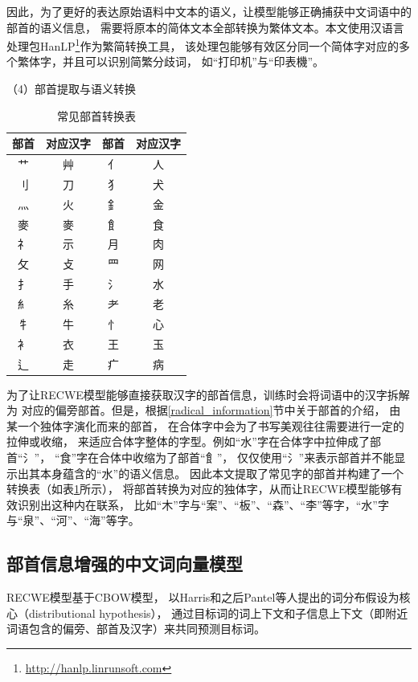 因此，为了更好的表达原始语料中文本的语义，让模型能够正确捕获中文词语中的部首的语义信息，
需要将原本的简体文本全部转换为繁体文本。本文使用汉语言处理包HanLP\footnote{\url{http://hanlp.linrunsoft.com}}作为繁简转换工具，
该处理包能够有效区分同一个简体字对应的多个繁体字，并且可以识别简繁分歧词，
如“打印机”与“印表機”。

（4）部首提取与语义转换

\begin{table}[h]
    \caption{常见部首转换表}
    \begin{tabular}{|c|c|c|c|}
        \hline
        部首 & 对应汉字 & 部首 & 对应汉字 \\
        \hline
        艹 & 艸 & 亻 & 人\\
        \hline
        刂 & 刀 & 犭 & 犬\\
        \hline
        灬 & 火 & 釒 & 金\\
        \hline
        麥 & 麥 & 飠 & 食\\
        \hline
        礻 & 示 & 月 & 肉\\
        \hline
        攵 & 攴 & 罒 & 网\\
        \hline
        扌 & 手 & 氵 & 水\\
        \hline
        糹 & 糸 & 耂 & 老\\
        \hline
        牜 & 牛 & 忄 & 心\\
        \hline
        衤 & 衣 & 王 & 玉\\
        \hline
        辶 & 走 & 疒 & 病\\
        \hline
    \end{tabular}
    \label{char_tran_form}
    \end{table}

为了让RECWE模型能够直接获取汉字的部首信息，训练时会将词语中的汉字拆解为
对应的偏旁部首。但是，根据\ref{radical_information}节中关于部首的介绍，
由某一个独体字演化而来的部首，
在合体字中会为了书写美观往往需要进行一定的拉伸或收缩，
来适应合体字整体的字型。例如“水”字在合体字中拉伸成了部首“氵”，
“食”字在合体中收缩为了部首“飠”，
仅仅使用“氵”来表示部首并不能显示出其本身蕴含的“水”的语义信息。
因此本文提取了常见字的部首并构建了一个转换表（如表\ref{char_tran_form}所示），
将部首转换为对应的独体字，从而让RECWE模型能够有效识别出这种内在联系，
比如“木”字与“案”、“板”、“森”、“李”等字，“水”字与“泉”、“河”、“海”等字。


\subsection{部首信息增强的中文词向量模型}
\label{recwe_section}
RECWE模型基于CBOW模型，
以Harris和之后Pantel等人提出的词分布假设为核心（distributional hypothesis），
通过目标词的词上下文和子信息上下文（即附近词语包含的偏旁、部首及汉字）来共同预测目标词。

